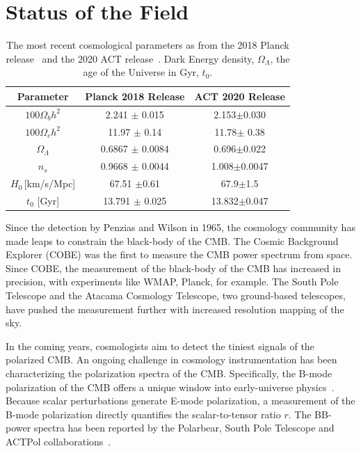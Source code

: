 \section{Status of the Field}
\begin{table}[b]
    \centering
    \begin{tabular}{|c|c|c|}\hline 
         Parameter & Planck 2018 Release & ACT 2020 Release \\ \hline
         $100\Omega_b h^2$ &  2.241 $\pm$ 0.015 &2.153$\pm$0.030 \\
         $100\Omega_c h^2$ & 11.97 $\pm$ 0.14 & 11.78$\pm$ 0.38\\
         $\Omega_\Lambda$ & 0.6867 $\pm$ 0.0084 & 0.696$\pm$0.022\\
         $n_s$ & 0.9668 $\pm$ 0.0044 & 1.008$\pm$0.0047\\
         $H_0$\,[km/s/Mpc] & 67.51 $\pm$0.61 & 67.9$\pm$1.5\\ 
         $t_0$ [Gyr] & 13.791 $\pm$ 0.025 & 13.832$\pm$0.047\\
         \hline
    \end{tabular}
    \caption{The most recent cosmological parameters as from the 2018 Planck release~\cite{planck2020} and the 2020 ACT release~\cite{aiola_2020}.  Dark Energy density, $\Omega_\Lambda$, the age of the Universe in Gyr, $t_0$.}
    \label{tab:cosmology_recent_results}
\end{table}

Since the detection by Penzias and Wilson in 1965, the cosmology community has made leaps to constrain the black-body of the CMB.  The Cosmic Background Explorer (COBE) was the first to measure the CMB power spectrum from space.  Since COBE, the measurement of the black-body of the CMB has increased in precision, with experiments like WMAP, Planck, for example.  The South Pole Telescope and the Atacama Cosmology Telescope, two ground-based telescopes, have pushed the measurement further with increased resolution mapping of the sky.

In the coming years, cosmologists aim to detect the tiniest signals of the polarized CMB.  An ongoing challenge in cosmology instrumentation has been characterizing the polarization spectra of the CMB.  Specifically, the B-mode polarization of the CMB offers a unique window into early-universe physics~\cite{}.  Because scalar perturbations generate E-mode polarization, a measurement of the B-mode polarization directly quantifies the scalar-to-tensor ratio $r$.  The BB-power spectra has been reported by the Polarbear, South Pole Telescope and ACTPol collaborations~\cite{}.

